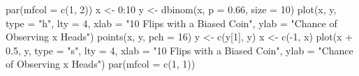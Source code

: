 \begin{Schunk}
\begin{Sinput}
 par(mfcol = c(1, 2))
 x <- 0:10
 y <- dbinom(x, p = 0.66, size = 10)
 plot(x, y, type = "h", lty = 4, xlab = "10 Flips with a Biased Coin", ylab = "Chance of Observing x Heads")
 points(x, y, pch = 16)
 y <- c(y[1], y)
 x <- c(-1, x)
 plot(x + 0.5, y, type = "s", lty = 4, xlab = "10 Flips with a Biased Coin", 
      ylab = "Chance of Observing x Heads")
 par(mfcol = c(1, 1))
\end{Sinput}
\end{Schunk}
